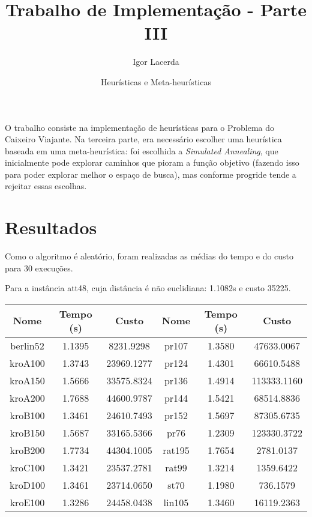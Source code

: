 \documentclass{article}
\author{Igor Lacerda}
\title{Trabalho de Implementação - Parte III}
\date{Heurísticas e Meta-heurísticas}
\begin{document}
\maketitle

O trabalho consiste na implementação de heurísticas para o Problema do Caixeiro Viajante. Na terceira parte, era necessário escolher uma heurística baseada em uma meta-heurística: foi escolhida a \textit{Simulated Annealing}, que inicialmente pode explorar caminhos que pioram a função objetivo (fazendo isso para poder explorar melhor o espaço de busca), mas conforme progride tende a rejeitar essas escolhas.

\section*{Resultados}

Como o algoritmo é aleatório, foram realizadas as médias do tempo e do custo para 30 execuções.

Para a instância att48, cuja distância é não euclidiana: 1.1082s e custo 35225.

\begin{tabular}{|| c c c | c c c ||}
    \hline
    Nome & Tempo (s) & Custo & Nome & Tempo (s) & Custo \\
    \hline
    berlin52 & 1.1395 & 8231.9298 & pr107 & 1.3580 & 47633.0067 \\
    kroA100 & 1.3743 & 23969.1277 & pr124 & 1.4301 & 66610.5488 \\
    kroA150 & 1.5666 & 33575.8324 & pr136 & 1.4914 & 113333.1160 \\
    kroA200 & 1.7688 & 44600.9787 & pr144 & 1.5421 & 68514.8836 \\
    kroB100 & 1.3461 & 24610.7493 & pr152 & 1.5697 & 87305.6735 \\
    kroB150 & 1.5687 & 33165.5366 & pr76 & 1.2309 & 123330.3722 \\
    kroB200 & 1.7734 & 44304.1005 & rat195 & 1.7654 & 2781.0137 \\
    kroC100 & 1.3421 & 23537.2781 & rat99 & 1.3214 & 1359.6422 \\
    kroD100 & 1.3461 & 23714.0650 & st70 & 1.1980 & 736.1579 \\
    kroE100 & 1.3286 & 24458.0438 & lin105 & 1.3460 & 16119.2363 \\
    \hline
\end{tabular}
\end{document}
